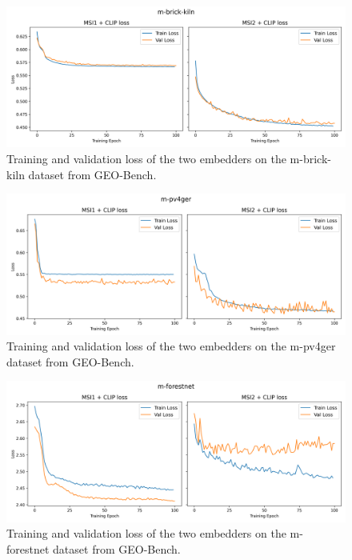 \documentclass[a4paper, oneside, english]{sapthesis} %
\begin{document}
\begin{figure}[h]
    \centering
    \includegraphics[width=\textwidth]{img/m-brick-kiln_loss_plot.png}
    \caption{Training and validation loss of the two embedders on the m-brick-kiln dataset from GEO-Bench.}
    \label{fig:brickloss}
\end{figure}

\begin{figure}[h]
    \centering
    \includegraphics[width=\textwidth]{img/m-pv4ger_loss_plot.png}
    \caption{Training and validation loss of the two embedders on the m-pv4ger dataset from GEO-Bench.}
    \label{fig:solarloss}
\end{figure}

\begin{figure}[h]
    \centering
    \includegraphics[width=\textwidth]{img/m-forestnet_loss_plot.png}
    \caption{Training and validation loss of the two embedders on the m-forestnet dataset from GEO-Bench.}
    \label{fig:foresloss}
\end{figure}
\end{document}
